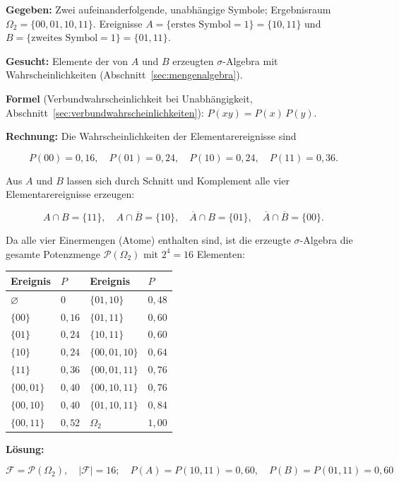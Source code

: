 \begin{beispiel}

\textbf{Gegeben:} Zwei aufeinanderfolgende, unabhängige Symbole; Ergebnisraum
$\Omega_2 = \{00,01,10,11\}$. Ereignisse $A = \{\text{erstes Symbol}=1\} = \{10,11\}$
und $B = \{\text{zweites Symbol}=1\} = \{01,11\}$.

\textbf{Gesucht:} Elemente der von $A$ und $B$ erzeugten $\sigma$-Algebra mit
Wahrscheinlichkeiten (Abschnitt~\ref{sec:mengenalgebra}).

\textbf{Formel} (Verbundwahrscheinlichkeit bei Unabhängigkeit,
Abschnitt~\ref{sec:verbundwahrscheinlichkeiten}): $P(xy) = P(x)\,P(y)$.

\textbf{Rechnung:} Die Wahrscheinlichkeiten der Elementarereignisse sind

$$
P(00)=0{,}16,\quad P(01)=0{,}24,\quad P(10)=0{,}24,\quad P(11)=0{,}36.
$$

Aus $A$ und $B$ lassen sich durch Schnitt und Komplement alle vier Elementarereignisse
erzeugen:

$$
A\cap B = \{11\},\quad A\cap\overline{B}=\{10\},\quad \overline{A}\cap B=\{01\},\quad
\overline{A}\cap\overline{B}=\{00\}.
$$

Da alle vier Einermengen (Atome) enthalten sind, ist die erzeugte $\sigma$-Algebra die
gesamte Potenzmenge $\mathcal{P}(\Omega_2)$ mit $2^{4} = 16$ Elementen:

\begin{center}
\renewcommand{\arraystretch}{1.2}
\begin{tabular}{ll|ll}
Ereignis & $P$ & Ereignis & $P$ \\
\hline
$\varnothing$        & $0$      & $\{01,10\}$          & $0{,}48$ \\
$\{00\}$             & $0{,}16$ & $\{01,11\}$          & $0{,}60$ \\
$\{01\}$             & $0{,}24$ & $\{10,11\}$          & $0{,}60$ \\
$\{10\}$             & $0{,}24$ & $\{00,01,10\}$       & $0{,}64$ \\
$\{11\}$             & $0{,}36$ & $\{00,01,11\}$       & $0{,}76$ \\
$\{00,01\}$          & $0{,}40$ & $\{00,10,11\}$       & $0{,}76$ \\
$\{00,10\}$          & $0{,}40$ & $\{01,10,11\}$       & $0{,}84$ \\
$\{00,11\}$          & $0{,}52$ & $\Omega_2$           & $1{,}00$ \\
\end{tabular}
\end{center}

\textbf{Lösung:}

$$
\boxed{\mathcal{F} = \mathcal{P}(\Omega_2),\quad |\mathcal{F}| = 16;\quad
P(A)=P(10,11)=0{,}60,\quad P(B)=P(01,11)=0{,}60}
$$

\end{beispiel}

